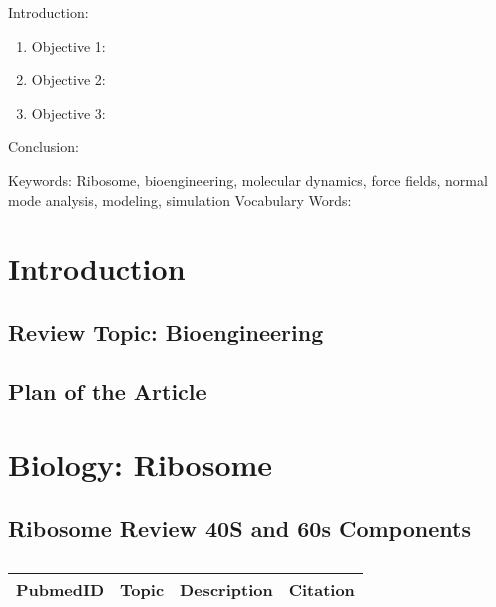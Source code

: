 

\twocolumn
\scriptsize
\begin{frontmatter}
		\title{}
		\author{}
		\address{The Mathematical Learning Space}
\end{frontmatter}	

Introduction:
\begin{enumerate}
\item Objective 1:
\item Objective 2:
\item Objective 3:
\end{enumerate}
Conclusion:

Keywords: Ribosome, bioengineering, molecular dynamics, force fields, normal mode analysis, modeling, simulation 
Vocabulary Words:

\section{Introduction}

\subsection{Review Topic: Bioengineering}

\subsection{Plan of the Article}

\section{Biology: Ribosome}
\vspace{6pt}

\subsection{Ribosome Review 40S and 60s Components}

\centering	
\begin{table}[H]\tiny
	\caption{}	
	\begin{tabular}{rp{1cm}|p{4cm}|l}
		\hline	
		PubmedID & Topic & Description & Citation \\
		\hline 
		\hline 
	\end{tabular}
\end{table}

